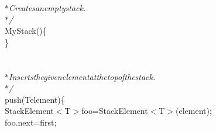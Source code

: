 {{\begin{tabbing}
{\it{\hspace{30pt}$\ast$\hspace{6pt}Creates\hspace{6pt}an\hspace{6pt}empty\hspace{6pt}stack.}}\\
{\it{\hspace{30pt}$\ast$/}}\\
\hspace{6pt}MyStack()\hspace{6pt}\{\\
\hspace{24pt}\}\\
\\
\hspace{24pt}{\it{/$\ast$$\ast$}}\\
{\it{\hspace{30pt}$\ast$\hspace{6pt}Inserts\hspace{6pt}the\hspace{6pt}given\hspace{6pt}element\hspace{6pt}at\hspace{6pt}the\hspace{6pt}top\hspace{6pt}of\hspace{6pt}the\hspace{6pt}stack.}}\\
{\it{\hspace{30pt}$\ast$/}}\\
\hspace{6pt}push(T\hspace{6pt}element)\hspace{6pt}\{\\
\hspace{48pt}StackElement$<$T$>$\hspace{6pt}foo\hspace{6pt}=\hspace{6pt}StackElement$<$T$>$(element);\\
\hspace{48pt}foo.next\hspace{6pt}=\hspace{6pt}first;\\

\end{tabbing}}}
